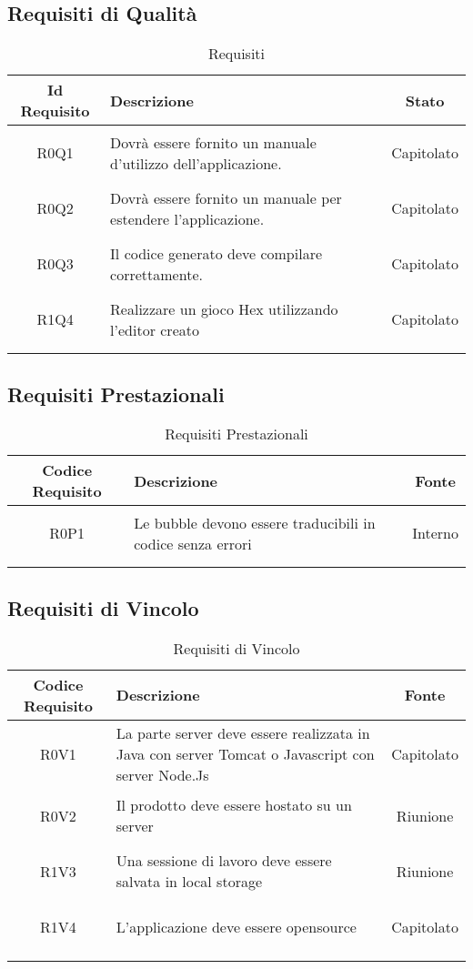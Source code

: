 \documentclass[../AnalisiDeiRequisiti.tex]{subfiles}
\begin{document}
\subsection{Requisiti di Qualità}
\normalsize
\begin{longtable}{|c|>{\centering}p{7cm}|c|}
	\hline
	\textbf{Id Requisito} & \textbf{Descrizione} & \textbf{Stato}\\
	\hline
	\endhead
	\hypertarget{R0Q1}{R0Q1} & Dovrà essere fornito un manuale d'utilizzo dell'applicazione. & Capitolato \\ \hline
	\hypertarget{R0Q2}{R0Q2} & Dovrà essere fornito un manuale per estendere l'applicazione. & Capitolato \\ \hline
	\hypertarget{R0Q3}{R0Q3} & Il codice generato deve compilare correttamente. & Capitolato \\ \hline
	\hypertarget{R1Q4}{R1Q4} & Realizzare un gioco Hex utilizzando l'editor creato & Capitolato \\ \hline
	\caption[Requisiti]{Requisiti}
	\label{tabella:req1}
\end{longtable}
\clearpage
\subsection{Requisiti Prestazionali}
\normalsize
\begin{longtable}{|c|>{\centering}p{7cm}|c|}
	\hline
	\textbf{Codice Requisito} & \textbf{Descrizione} & \textbf{Fonte}\\
	\hline
	\endhead
	\hypertarget{R0P1}{R0P1} & Le bubble devono essere traducibili in codice senza errori & Interno \\ \hline
	\caption[Requisiti Prestazionali]{Requisiti Prestazionali}
	\label{tabella:req2}
\end{longtable}
\clearpage
\subsection{Requisiti di Vincolo}
\normalsize
\begin{longtable}{|c|>{\centering}p{7cm}|c|}
	\hline
	\textbf{Codice Requisito} & \textbf{Descrizione} & \textbf{Fonte}\\
	\hline
	\endhead
	\hypertarget{R0V1}{R0V1} & La parte server deve essere realizzata in Java con server Tomcat o Javascript con server Node.Js & Capitolato \\ \hline
	\hypertarget{R0V2}{R0V2} & Il prodotto deve essere hostato su un server & Riunione \\ \hline
	\hypertarget{R1V3}{R1V3} & Una sessione di lavoro deve essere salvata in local storage & Riunione \\ \hline
	\hypertarget{R1V4}{R1V4} & L'applicazione deve essere opensource
	& Capitolato \\ \hline
	\caption[Requisiti di Vincolo]{Requisiti di Vincolo}
	\label{tabella:req3}
\end{longtable}
\clearpage
\end{document}
